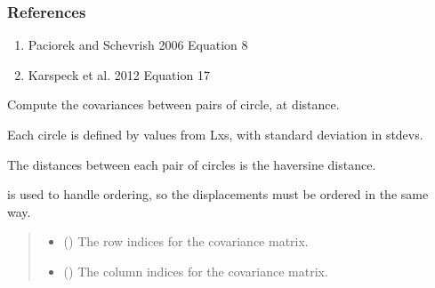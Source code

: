 \documentclass[letterpaper,10pt,english]{sphinxmanual}
\begin{document}
\begin{fulllineitems}
\begin{fulllineitems}
\subsubsection*{References}
\begin{enumerate}
%
\item {}
\sphinxAtStartPar
Paciorek and Schevrish 2006  Equation 8

\item {}
\sphinxAtStartPar
Karspeck et al. 2012  Equation 17

\end{enumerate}

\end{fulllineitems}


\begin{fulllineitems}
\label{\detokenize{ellipse:glomar_gridding.ellipse.EllipseCovarianceBuilder.c_ij_isotropic_array}}
\pysigstartsignatures
\pysiglinewithargsret
{}
{\sphinxparamcomma {}\sphinxparamcomma {}}
{}
\pysigstopsignatures
\sphinxAtStartPar
Compute the covariances between pairs of circle, at distance.

\sphinxAtStartPar
Each circle is defined by values from Lxs, with standard deviation in
stdevs.

\sphinxAtStartPar
The distances between each pair of circles is the haversine distance.

\sphinxAtStartPar
{} is used to handle ordering, so the
displacements must be ordered in the same way.
\begin{quote}\begin{description}
\begin{itemize}
\item {}
\sphinxAtStartPar
{} () \textendash{} The row indices for the covariance matrix.

\item {}
\sphinxAtStartPar
{} () \textendash{} The column indices for the covariance matrix.


\end{itemize}
\end{description}
\end{quote}
\end{fulllineitems}
\end{fulllineitems}
\end{document}
